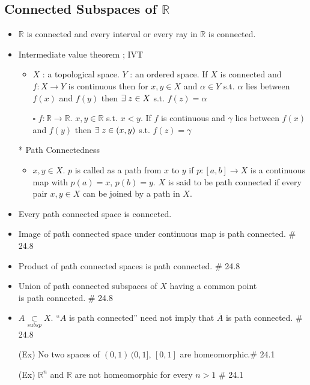 \documentclass[12pt]{article}
\newcommand{\sq}{$\square$}
\newcommand{\spone}{\hspace{0.1cm}}
\newcommand{\Real}{\mathbb{R}}
\newcommand{\subsp}{\underset{subsp}{\subset}}
\newcommand{\cl}{\overline}
\newcommand{\exist}{\exists\spone}
\begin{document}
\subsection{Connected Subspaces of $\Real$}
\smallskip
\begin{itemize}
	\item $\Real$ is connected and every interval or every ray in $\Real$ is connected.
	\item Intermediate value theorem ; IVT
	\begin{itemize}
		\item $X$ : a topological space. $Y$ : an ordered space. If $X$ is connected and $f : X\rightarrow Y$ is continuous then for $x,y\in X$ and $\alpha \in Y$ s.t. $\alpha$ lies between $f(x)$ and $f(y)$ then $\exist z\in X$ s.t. $f(z)=\alpha$
		\item[\sq] $f:\Real\rightarrow \Real$. $x,y\in \Real$ s.t. $x<y$. If $f$ is continuous and $\gamma$ lies between $f(x)$ and $f(y)$ then $\exist z\in (x,y)$\; s.t. $f(z)=\gamma$ 
	\end{itemize}
	\item[*]Path Connectedness
	\begin{itemize}
		\item $x,y\in X$. $p$ is called as a path from $x$ to $y$ if $p:[a,b]\rightarrow X$ is a continuous map with $p(a)=x,\, p(b)=y$. $X$ is said to be path connected if every pair $x,y\in X$ can be joined by a path in $X$. 
	\end{itemize} 
	\item Every path connected space is connected. 
	\item Image of path connected space under continuous map is path connected. \; \# 24.8
	\item Product of path connected spaces is path connected. \; \# 24.8
	\item Union of path connected subspaces of $X$ having a common point\\ is path connected. \; \# 24.8
	\item $A\subsp X$. ``$A$ is path connected'' need not imply that $\cl{A}$ is path connected.  \; \# 24.8
	\item[(Ex)]No two spaces of $(0,1)\, (0,1],\, [0,1]$ are homeomorphic.\quad \# 24.1
	\item[(Ex)]$\Real^n$ and $\Real$ are not homeomorphic for every $n>1$ \quad \# 24.1
\end{itemize}
\bigskip
\end{document}
